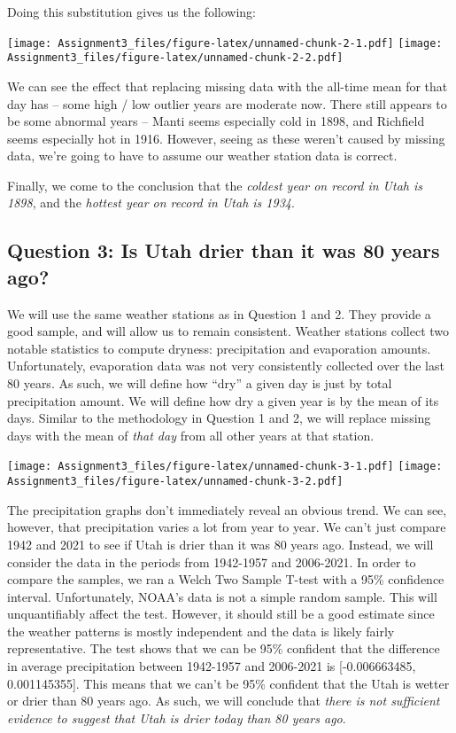 \documentclass[
]{article}
\begin{document}
Doing this substitution gives us the following:

\texttt{[image: Assignment3\_files/figure-latex/unnamed-chunk-2-1.pdf]}
\texttt{[image: Assignment3\_files/figure-latex/unnamed-chunk-2-2.pdf]}

We can see the effect that replacing missing data with the all-time mean
for that day has -- some high / low outlier years are moderate now.
There still appears to be some abnormal years -- Manti seems especially
cold in 1898, and Richfield seems especially hot in 1916. However,
seeing as these weren't caused by missing data, we're going to have to
assume our weather station data is correct.

Finally, we come to the conclusion that the \emph{coldest year on record
in Utah is 1898}, and the \emph{hottest year on record in Utah is 1934}.

\hypertarget{question-3-is-utah-drier-than-it-was-80-years-ago}{%
\subsection{Question 3: Is Utah drier than it was 80 years
ago?}\label{question-3-is-utah-drier-than-it-was-80-years-ago}}

We will use the same weather stations as in Question 1 and 2. They
provide a good sample, and will allow us to remain consistent. Weather
stations collect two notable statistics to compute dryness:
precipitation and evaporation amounts. Unfortunately, evaporation data
was not very consistently collected over the last 80 years. As such, we
will define how ``dry'' a given day is just by total precipitation
amount. We will define how dry a given year is by the mean of its days.
Similar to the methodology in Question 1 and 2, we will replace missing
days with the mean of \emph{that day} from all other years at that
station.

\texttt{[image: Assignment3\_files/figure-latex/unnamed-chunk-3-1.pdf]}
\texttt{[image: Assignment3\_files/figure-latex/unnamed-chunk-3-2.pdf]}

The precipitation graphs don't immediately reveal an obvious trend. We
can see, however, that precipitation varies a lot from year to year. We
can't just compare 1942 and 2021 to see if Utah is drier than it was 80
years ago. Instead, we will consider the data in the periods from
1942-1957 and 2006-2021. In order to compare the samples, we ran a Welch
Two Sample T-test with a 95\% confidence interval. Unfortunately, NOAA's
data is not a simple random sample. This will unquantifiably affect the
test. However, it should still be a good estimate since the weather
patterns is mostly independent and the data is likely fairly
representative. The test shows that we can be 95\% confident that the
difference in average precipitation between 1942-1957 and 2006-2021 is
{[}-0.006663485, 0.001145355{]}. This means that we can't be 95\%
confident that the Utah is wetter or drier than 80 years ago. As such,
we will conclude that \emph{there is not sufficient evidence to suggest
that Utah is drier today than 80 years ago}.
\end{document}
